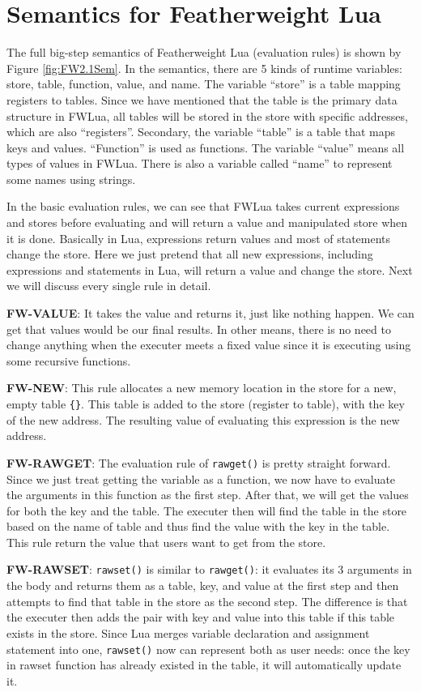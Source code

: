 \section{Semantics for Featherweight Lua}\label{sec: FWLUAsemantic}
The full big-step semantics of Featherweight Lua (evaluation rules) is shown by Figure \ref{fig:FW2.1Sem}. In the semantics, there are 5 kinds of runtime variables: store, table, function, value, and name. The variable ``store'' is a table mapping registers to tables. Since we have mentioned that the table is the primary data structure in FWLua, all tables will be stored in the store with specific addresses, which are also ``registers''. Secondary, the variable ``table'' is a table that maps keys and values. ``Function'' is used as functions. The variable ``value'' means all types of values in FWLua. There is also a variable called ``name'' to represent some names using strings.

In the basic evaluation rules, we can see that FWLua takes current expressions and stores before evaluating and will return a value and manipulated store when it is done. Basically in Lua, expressions return values and most of statements change the store. Here we just pretend that all new expressions, including expressions and statements in Lua, will return a value and change the store. Next we will discuss every single rule in detail.

{\bf FW-VALUE}: It takes the value and returns it, just like nothing happen. We can get that values would be our final results. In other means, there is no need to change anything when the executer meets a fixed value since it is executing using some recursive functions. 

{\bf FW-NEW}: This rule allocates a new memory location in the store for a new, empty table {\tt \{\}}. This table is added to the store (register to table), with the key of the new address.  The resulting value of evaluating this expression is the new address.

{\bf FW-RAWGET}: The evaluation rule of {\tt rawget()} is pretty straight forward. Since we just treat getting the variable as a function, we now have to evaluate the arguments in this function as the first step. After that, we will get the values for both the key and the table. The executer then will find the table in the store based on the name of table and thus find the value with the key in the table. This rule return the value that users want to get from the store.

{\bf FW-RAWSET}: {\tt rawset()} is similar to {\tt rawget()}: it evaluates its 3 arguments in the body and returns them as a table, key, and value at the first step and then attempts to find that table in the store as the second step. The difference is that the executer then adds the pair with key and value into this table if this table exists in the store. Since Lua merges variable declaration and assignment statement into one, {\tt rawset()} now can represent both as user needs: once the key in rawset function has already existed in the table, it will automatically update it.

